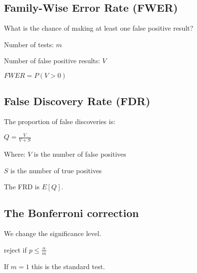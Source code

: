 
\subsection{Family-Wise Error Rate (FWER)}

What is the chance of making at least one false positive result?

Number of tests: \(m\)

Number of false positive results: \(V\)

\(FWER=P(V>0)\)

\subsection{False Discovery Rate (FDR)}

The proportion of false discoveries is:

\(Q=\frac{V}{V+S}\)

Where:
\(V\) is the number of false positives

\(S\) is the number of true positives

The FRD is \(E[Q]\).

\subsection{The Bonferroni correction}

We change the significance level.

reject if \(p\le \frac{\alpha }{m}\)

If \(m=1\) this is the standard test.

